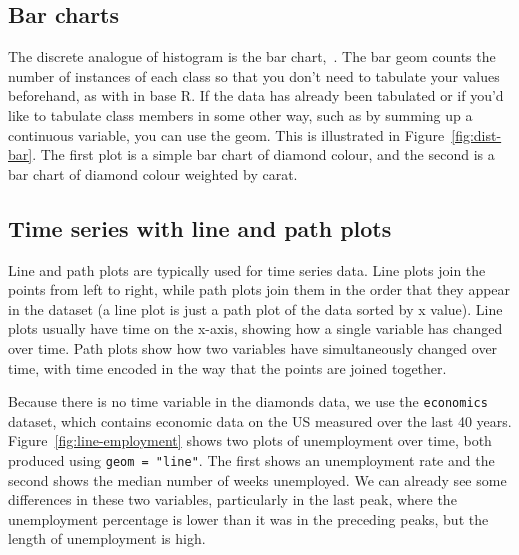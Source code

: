 \subsection{Bar charts}
\label{sub:bar}

The discrete analogue of histogram is the bar chart,~. The bar geom counts the number of instances of each class so that you don't need to tabulate your values beforehand, as with  in base R. If the data has already been tabulated or if you'd like to tabulate class members in some other way, such as by summing up a continuous variable, you can use the  geom. This is illustrated in Figure~\ref{fig:dist-bar}. The first plot is a simple bar chart of diamond colour, and the second is a bar chart of diamond colour weighted by carat.  

% 


\subsection{Time series with line and path plots}
\label{sub:line}

Line and path plots are typically used for time series data.  Line plots join the points from left to right, while path plots join them in the order that they appear in the dataset (a line plot is just a path plot of the data sorted by x value).  Line plots usually have time on the x-axis, showing how a single variable has changed over time.  Path plots show how two variables have simultaneously changed over time, with time encoded in the way that the points are joined together.

Because there is no time variable in the diamonds data, we use the {\tt economics} dataset, which contains economic data on the US measured over the last 40 years. Figure~\ref{fig:line-employment} shows two plots of unemployment over time, both produced using {\tt geom = "line"}. The first shows an unemployment rate and the second shows the median number of weeks unemployed. We can already see some differences in these two variables, particularly in the last peak, where the unemployment percentage is lower than it was in the preceding peaks, but the length of unemployment is high.   

